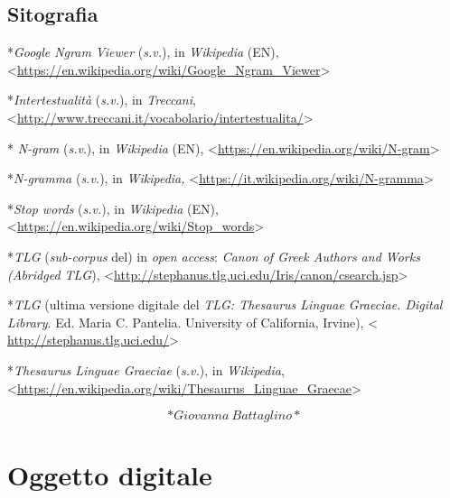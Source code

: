 \documentclass[
  b5paper,
  twoside,
  12pt,
  chapterprefix=false,
  bibliography=totocnumbered,
  parskip=false]{scrbook}
\begin{document}
\hypertarget{sitografia-22}{%
\section*{Sitografia}\label{sitografia-22}}

*\emph{Google Ngram Viewer} (\emph{s.v.}), in \emph{Wikipedia} (EN),
\textless{}\href{https://en.wikipedia.org/wiki/Google_Ngram_Viewer}{{https://en.wikipedia.org/wiki/Google\_Ngram\_Viewer}}\textgreater{}

*\emph{Intertestualità} (\emph{s.v.}), in \emph{Treccani},
\textless{}\href{http://www.treccani.it/vocabolario/intertestualita/}{{http://www.treccani.it/vocabolario/intertestualita/}}\textgreater{}

* \emph{N-gram} (\emph{s.v}.), in \emph{Wikipedia} (EN),
\textless{}\href{https://en.wikipedia.org/wiki/N-gram}{{https://en.wikipedia.org/wiki/N-gram}}\textgreater{}

*\emph{N-gramma} (\emph{s.v.}), in \emph{Wikipedia,}
\textless{}\href{https://it.wikipedia.org/wiki/N-gramma}{{https://it.wikipedia.org/wiki/N-gramma}}\textgreater{}

*\emph{Stop words} (\emph{s.v.}), in \emph{Wikipedia} (EN),
\textless{}\href{https://en.wikipedia.org/wiki/Stop_words}{{https://en.wikipedia.org/wiki/Stop\_words}}\textgreater{}

*\emph{TLG} (\emph{sub-corpus} del) in \emph{open access}: \emph{Canon of Greek Authors and
Works (Abridged TLG}),
\textless{}\href{http://stephanus.tlg.uci.edu/Iris/canon/csearch.jsp}{{http://stephanus.tlg.uci.edu/Iris/canon/csearch.jsp}}\textgreater{}

*\emph{TLG} (ultima versione digitale del \emph{TLG: Thesaurus Linguae Graeciae.
Digital Library}. Ed. Maria C. Pantelia. University of California,
Irvine), \textless{}
\href{http://stephanus.tlg.uci.edu/}{{http://stephanus.tlg.uci.edu/}}\textgreater{}

*\emph{Thesaurus Linguae Graeciae} (\emph{s.v.}), in \emph{Wikipedia},
\textless{}\href{https://en.wikipedia.org/wiki/Thesaurus_Linguae_Graecae}{{https://en.wikipedia.org/wiki/Thesaurus\_Linguae\_Graecae}}\textgreater{}

\[*Giovanna~Battaglino*\]

\hypertarget{oggetto-digitale}{%
\chapter{Oggetto digitale}\label{oggetto-digitale}}
\end{document}

